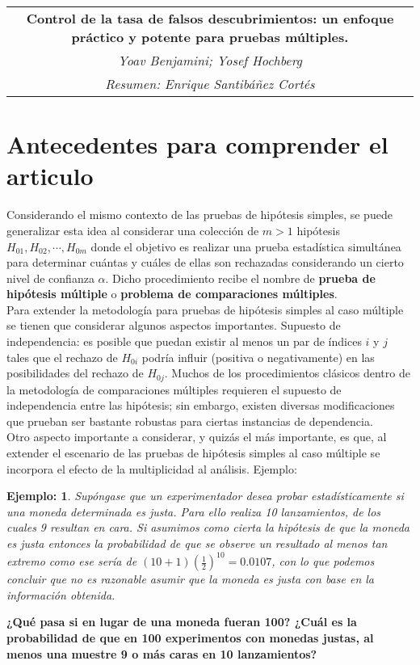 \documentclass[11pt,letterpaper]{article}
\newtheorem{thme}{Ejemplo:}
\begin{document}
\begin{table}[ht]
\centering
\begin{tabular}{c}
\textbf{Control de la tasa de falsos descubrimientos: un enfoque práctico y potente para pruebas múltiples.}\\
\emph{Yoav Benjamini; Yosef Hochberg}\\
\textit{Resumen: Enrique Santibáñez Cortés}
\end{tabular}
\end{table}

\section*{Antecedentes para comprender el articulo}
Considerando el mismo contexto de las pruebas de hipótesis simples, se puede generalizar esta idea al considerar una colección de $m>1$ hipótesis $H_{01},H_{02},\cdots,H_{0m}$ donde el objetivo es realizar una prueba estadística simultánea para determinar cuántas y cuáles de ellas son rechazadas considerando un cierto nivel de confianza $\alpha$. Dicho procedimiento recibe el nombre de \textbf{prueba de hipótesis múltiple} o \textbf{problema de comparaciones múltiples}. \\

Para extender la metodología para pruebas de hipótesis simples al caso múltiple se tienen que considerar algunos aspectos importantes. Supuesto de independencia: es posible que puedan existir al menos un par de índices $i$ y $j$ tales que el rechazo de $H_{0i}$ podría influir (positiva o negativamente) en las posibilidades del rechazo de $H_{0j}$.
 Muchos de los procedimientos clásicos dentro de la metodología de comparaciones múltiples requieren el supuesto de independencia entre las hipótesis; sin embargo, existen diversas modificaciones que prueban ser bastante robustas para ciertas instancias de dependencia.\\
Otro aspecto importante a considerar, y quizás el más importante, es que, al extender el escenario de las pruebas de hipótesis simples al caso múltiple se incorpora el efecto de la multiplicidad al análisis. Ejemplo:
\begin{framed}
    \begin{thme} \label{e_moneda_multiplicada}
Supóngase que un experimentador desea probar estadísticamente si una moneda determinada es justa. Para ello realiza 10 lanzamientos, de los cuales 9 resultan en cara. Si asumimos como cierta la hipótesis de que la moneda es justa entonces la probabilidad de que se observe un resultado al menos tan extremo como ese sería de $(10 + 1)(\frac{1}{2})^10= 0.0107$, con lo que podemos concluir que no es razonable asumir que
la moneda es justa con base en la información obtenida.
    \end{thme}
\end{framed}
\textbf{¿Qué pasa si en lugar de una moneda fueran 100? ¿Cuál es la probabilidad de que en 100 experimentos con monedas justas, al menos una muestre 9 o más caras en 10 lanzamientos?}\\
\end{document}
